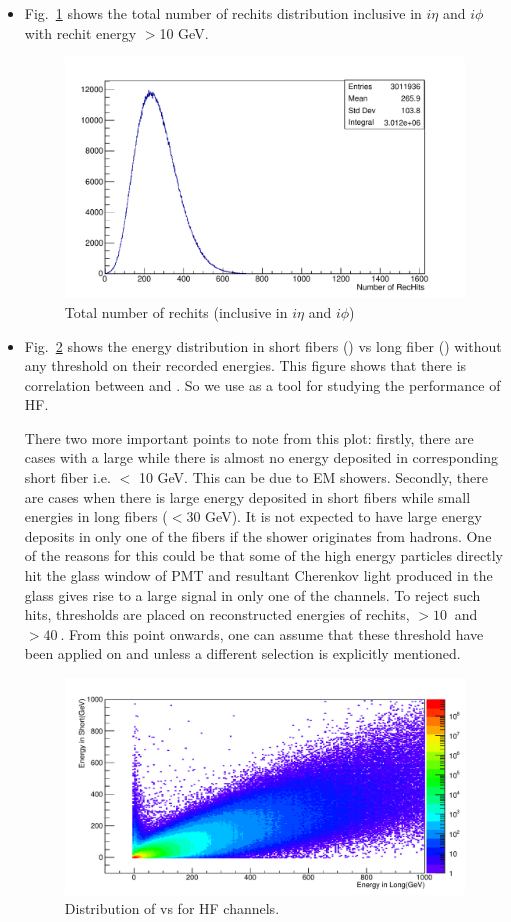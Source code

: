 \begin{itemize}
\item Fig.~\ref{fig:nRecHits} shows the total number of rechits 
distribution inclusive in $i\eta$ and $i\phi$ with rechit energy 
$>$10 GeV.
\begin{figure}[h!]
\centering
\includegraphics[width=0.5\linewidth]{../Figures/Chap2/ImageFiles_HF/BasicPics/nRecHits.pdf}
\caption{Total number of rechits (inclusive in $i\eta$ and $i\phi$) }
\label{fig:nRecHits}
\end{figure}
\item Fig.~\ref{fig:EsvsElNoECut} shows the energy distribution in 
short fibers (\eshort) vs long fiber (\elong) without any threshold
on their recorded energies. This figure shows that there is correlation 
between \elong and \eshort. So we use \ratiosl as a tool for studying 
the performance of HF.

There two more important points to note from this plot: firstly, there
are cases with a large \elong while there is almost no energy deposited 
in corresponding short fiber i.e. \eshort$<$ 10 GeV. This can be due to EM showers. Secondly, there are
cases when there is large energy deposited in short fibers while small
energies in long fibers (\elong$<$30 GeV). It is not expected to have 
large energy deposits in only one of the fibers if the shower originates
from hadrons. One of the reasons for this could be that some of the 
high energy particles directly hit the glass window of PMT and resultant Cherenkov light produced in the glass gives rise
to a large signal in only one of the channels. To reject such hits, 
thresholds are placed on reconstructed energies of rechits, \eshort$>10~$\gev
and \elong$>40~$\gev. From this point onwards, one can assume that these 
threshold have been applied on \eshort and \elong unless a different 
selection is explicitly mentioned.

\begin{figure}[h!]
\centering
\includegraphics[width=0.7\linewidth]{../Figures/Chap2/ImageFiles_HF/BasicPics/EsvsElNoECut.pdf}
\caption{Distribution of \eshort vs \elong for HF channels.}
\label{fig:EsvsElNoECut}
\end{figure}


\end{itemize}
